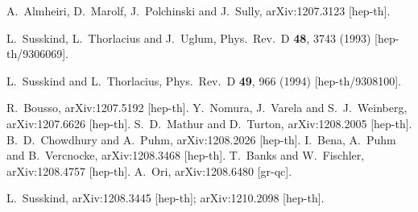 \documentclass[11pt,twoside]{article}
\begin{document}
\begin{thebibliography}{99}
  A.~Almheiri, D.~Marolf, J.~Polchinski and J.~Sully,
  arXiv:1207.3123 [hep-th].

  L.~Susskind, L.~Thorlacius and J.~Uglum,
  Phys.\ Rev.\ D {\bf 48}, 3743 (1993)
  [hep-th/9306069].

  L.~Susskind and L.~Thorlacius,
  Phys.\ Rev.\ D {\bf 49}, 966 (1994)
  [hep-th/9308100].

  R.~Bousso,
  arXiv:1207.5192 [hep-th].
  Y.~Nomura, J.~Varela and S.~J.~Weinberg,
  arXiv:1207.6626 [hep-th].
  S.~D.~Mathur and D.~Turton,
  arXiv:1208.2005 [hep-th].
  B.~D.~Chowdhury and A.~Puhm,
  arXiv:1208.2026 [hep-th].
  I.~Bena, A.~Puhm and B.~Vercnocke,
  arXiv:1208.3468 [hep-th].
  T.~Banks and W.~Fischler,
  arXiv:1208.4757 [hep-th].
  A.~Ori,
  arXiv:1208.6480 [gr-qc].


  L.~Susskind,
  arXiv:1208.3445 [hep-th];
  arXiv:1210.2098 [hep-th].



\end{thebibliography}
\end{document}
